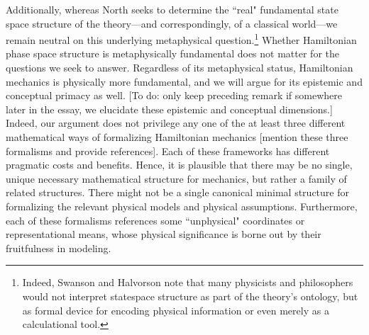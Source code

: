 \documentclass[letterpaper]{article}
\begin{document}
Additionally, whereas North \parencites*[76]{North} seeks to determine the ``real" fundamental state space structure of the theory---and correspondingly, of a classical world---we remain neutral on this underlying metaphysical question.\footnote{Indeed, Swanson and Halvorson \parencites*[]{Swanson} note that many physicists and philosophers would not interpret statespace structure as part of the theory's ontology, but as formal device for encoding physical information or even merely as a calculational tool.} Whether Hamiltonian phase space structure is metaphysically fundamental does not matter for the questions we seek to answer. Regardless of its metaphysical status, Hamiltonian mechanics is physically more fundamental, and we will argue for its epistemic and conceptual primacy as well. [To do: only keep preceding remark if somewhere later in the essay, we elucidate these epistemic and conceptual dimensions.] Indeed, our argument does not privilege any one of the at least three different mathematical ways of formalizing Hamiltonian mechanics [mention these three formalisms and provide references]. Each of these frameworks has different pragmatic costs and benefits. Hence, it is plausible that there may be no single, unique necessary mathematical structure for mechanics, but rather a family of related structures. There might not be a single canonical minimal structure for formalizing the relevant physical models and physical assumptions. Furthermore, each of these formalisms references some ``unphysical" coordinates or representational means, whose physical significance is borne out by their fruitfulness in modeling. 
\end{document}
